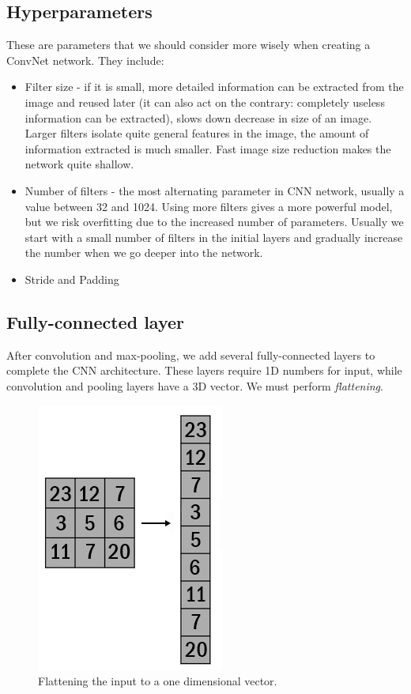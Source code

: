 \documentclass[conference]{IEEEtran}
\begin{document}
\subsection{Hyperparameters}
These are parameters that we should consider more wisely when creating a ConvNet network. They include:
\begin{itemize}
    \item Filter size - if it is small, more detailed information can be extracted from the image and reused later (it can also act on the contrary: completely useless information can be extracted), slows down decrease in size of an image. Larger filters isolate quite general features in the image, the amount of information extracted is much smaller. Fast image size reduction makes the network quite shallow.
    \item Number of filters - the most alternating parameter in CNN network, usually a value between 32 and 1024. Using more filters gives a more powerful model, but we risk overfitting due to the increased number of parameters. Usually we start with a small number of filters in the initial layers and gradually increase the number when we go deeper into the network.
    \item Stride and Padding
\end{itemize}
\subsection{Fully-connected layer}
After convolution and max-pooling, we add several fully-connected layers to complete the CNN architecture. These layers require 1D numbers for input, while convolution and pooling layers have a 3D vector. We must perform \textit{flattening}.

\begin{figure}[hbt!]
 \centering
    \includegraphics[scale=0.35]{flattening-b.png}
	    \caption{Flattening the input to a one dimensional vector.}
	    \label{fig:my_label}
\end{figure}
\end{document}

